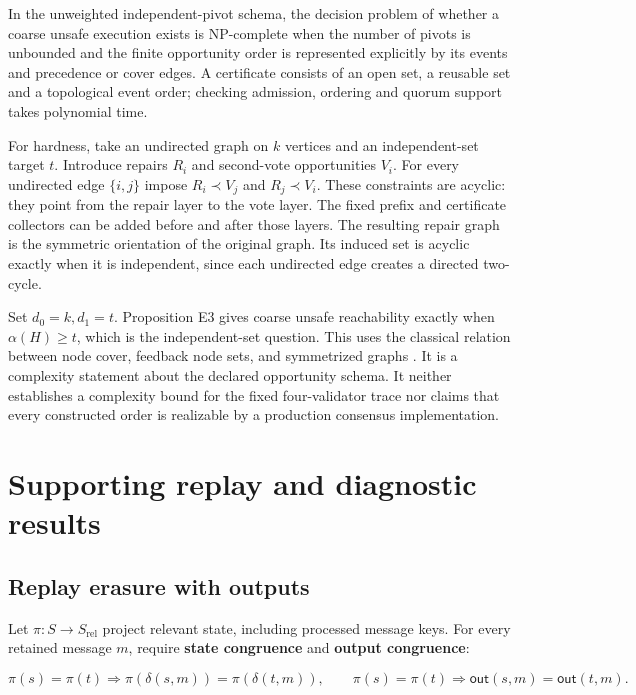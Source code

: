 In the unweighted independent-pivot schema, the decision problem of
whether a coarse unsafe execution exists is NP-complete when the number
of pivots is unbounded and the finite opportunity order is represented
explicitly by its events and precedence or cover edges. A certificate
consists of an open set, a reusable set and a topological event order;
checking admission, ordering and quorum support takes polynomial time.

For hardness, take an undirected graph on \(k\) vertices and an
independent-set target \(t\). Introduce repairs \(R_i\) and second-vote
opportunities \(V_i\). For every undirected edge \(\{i,j\}\) impose
\(R_i\prec V_j\) and \(R_j\prec V_i\). These constraints are acyclic:
they point from the repair layer to the vote layer. The fixed prefix and
certificate collectors can be added before and after those layers. The
resulting repair graph is the symmetric orientation of the original
graph. Its induced set is acyclic exactly when it is independent, since
each undirected edge creates a directed two-cycle.

Set \(d_0=k,d_1=t\). Proposition E3 gives coarse unsafe reachability
exactly when \(\alpha(H)\ge t\), which is the independent-set question.
This uses the classical relation between node cover, feedback node sets,
and symmetrized graphs \cite{karp1972reducibility}. It is a complexity
statement about the declared opportunity schema. It neither establishes
a complexity bound for the fixed four-validator trace nor claims that
every constructed order is realizable by a production consensus
implementation.

\section{Supporting replay and diagnostic
results}\label{supporting-replay-and-diagnostic-results}

\label{app:replay}

\subsection{Replay erasure with
outputs}\label{replay-erasure-with-outputs}

Let \(\pi:S\to S_{\mathrm{rel}}\) project relevant state, including
processed message keys. For every retained message \(m\), require
\textbf{state congruence} and \textbf{output congruence}:

\[
\pi(s)=\pi(t)\Rightarrow
\pi(\delta(s,m))=\pi(\delta(t,m)),
\qquad
\pi(s)=\pi(t)\Rightarrow \mathsf{out}(s,m)=\mathsf{out}(t,m).
\]

